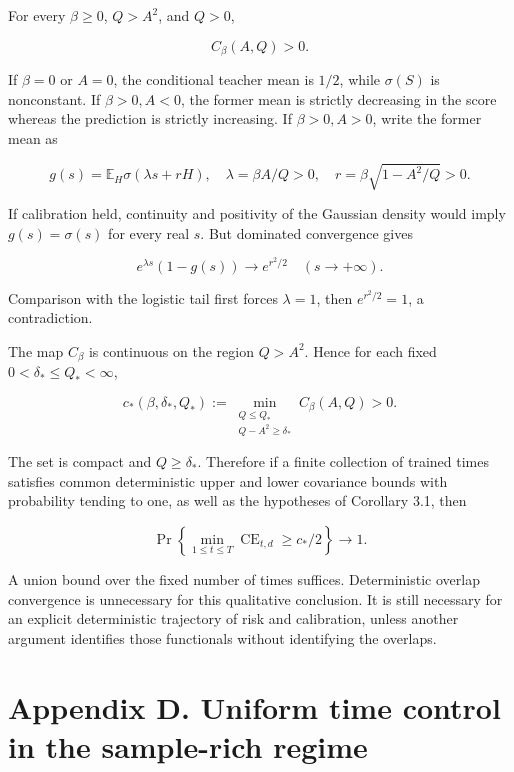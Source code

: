 \documentclass[
  11pt,
  a4paper,
]{article}
\begin{document}
For every \(\beta\ge0\), \(Q>A^2\), and \(Q>0\),

\[
C_\beta(A,Q)>0.
\tag{C.4.4}
\]

If \(\beta=0\) or \(A=0\), the conditional teacher mean is \(1/2\),
while \(\sigma(S)\) is nonconstant. If \(\beta>0,A<0\), the former mean
is strictly decreasing in the score whereas the prediction is strictly
increasing. If \(\beta>0,A>0\), write the former mean as

\[
g(s)=\mathbb E_H\sigma(\lambda s+rH),\quad
\lambda=\beta A/Q>0,\quad r=\beta\sqrt{1-A^2/Q}>0.
\]

If calibration held, continuity and positivity of the Gaussian density
would imply \(g(s)=\sigma(s)\) for every real \(s\). But dominated
convergence gives

\[
e^{\lambda s}(1-g(s))\longrightarrow e^{r^2/2}
\quad(s\to+\infty).
\]

Comparison with the logistic tail first forces \(\lambda=1\), then
\(e^{r^2/2}=1\), a contradiction.

The map \(C_\beta\) is continuous on the region \(Q>A^2\). Hence for
each fixed \(0<\delta_*\le Q_*<\infty\),

\[
c_*(\beta,\delta_*,Q_*)
 :=\min_{\substack{Q\le Q_*\\Q-A^2\ge\delta_*}}
 C_\beta(A,Q)>0.
\tag{C.4.5}
\]

The set is compact and \(Q\ge\delta_*\). Therefore if a finite
collection of trained times satisfies common deterministic upper and
lower covariance bounds with probability tending to one, as well as the
hypotheses of Corollary 3.1, then

\[
\Pr\left\{\min_{1\le t\le T}\operatorname{CE}_{t,d}
                    \ge c_*/2\right\}\longrightarrow1.
\tag{C.4.6}
\]

A union bound over the fixed number of times suffices. Deterministic
overlap convergence is unnecessary for this qualitative conclusion. It
is still necessary for an explicit deterministic trajectory of risk and
calibration, unless another argument identifies those functionals
without identifying the overlaps.

\clearpage

\hypertarget{appendix-d.-uniform-time-control-in-the-sample-rich-regime}{%
\section{Appendix D. Uniform time control in the sample-rich
regime}\label{appendix-d.-uniform-time-control-in-the-sample-rich-regime}}
\end{document}
